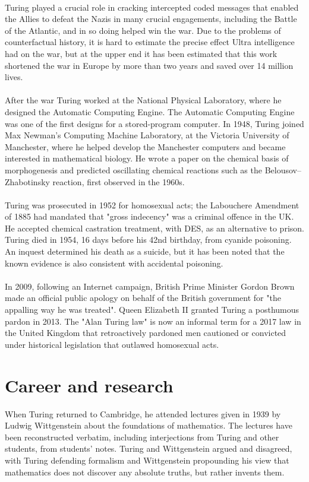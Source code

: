 \documentclass{article}
\begin{document}
\\
Turing played a crucial role in cracking intercepted coded messages that enabled the Allies to defeat the Nazis in many crucial engagements, including the Battle of the Atlantic, and in so doing helped win the war. Due to the problems of counterfactual history, it is hard to estimate the precise effect Ultra intelligence had on the war, but at the upper end it has been estimated that this work shortened the war in Europe by more than two years and saved over 14 million lives.\\
\\
After the war Turing worked at the National Physical Laboratory, where he designed the Automatic Computing Engine. The Automatic Computing Engine was one of the first designs for a stored-program computer. In 1948, Turing joined Max Newman's Computing Machine Laboratory, at the Victoria University of Manchester, where he helped develop the Manchester computers and became interested in mathematical biology. He wrote a paper on the chemical basis of morphogenesis and predicted oscillating chemical reactions such as the Belousov–Zhabotinsky reaction, first observed in the 1960s.\\
\\
Turing was prosecuted in 1952 for homosexual acts; the Labouchere Amendment of 1885 had mandated that "gross indecency" was a criminal offence in the UK. He accepted chemical castration treatment, with DES, as an alternative to prison. Turing died in 1954, 16 days before his 42nd birthday, from cyanide poisoning. An inquest determined his death as a suicide, but it has been noted that the known evidence is also consistent with accidental poisoning.\\
\\
In 2009, following an Internet campaign, British Prime Minister Gordon Brown made an official public apology on behalf of the British government for "the appalling way he was treated". Queen Elizabeth II granted Turing a posthumous pardon in 2013. The "Alan Turing law" is now an informal term for a 2017 law in the United Kingdom that retroactively pardoned men cautioned or convicted under historical legislation that outlawed homosexual acts.\\

\section{Career and research}

When Turing returned to Cambridge, he attended lectures given in 1939 by Ludwig Wittgenstein about the foundations of mathematics. The lectures have been reconstructed verbatim, including interjections from Turing and other students, from students' notes. Turing and Wittgenstein argued and disagreed, with Turing defending formalism and Wittgenstein propounding his view that mathematics does not discover any absolute truths, but rather invents them.\\
\end{document}
